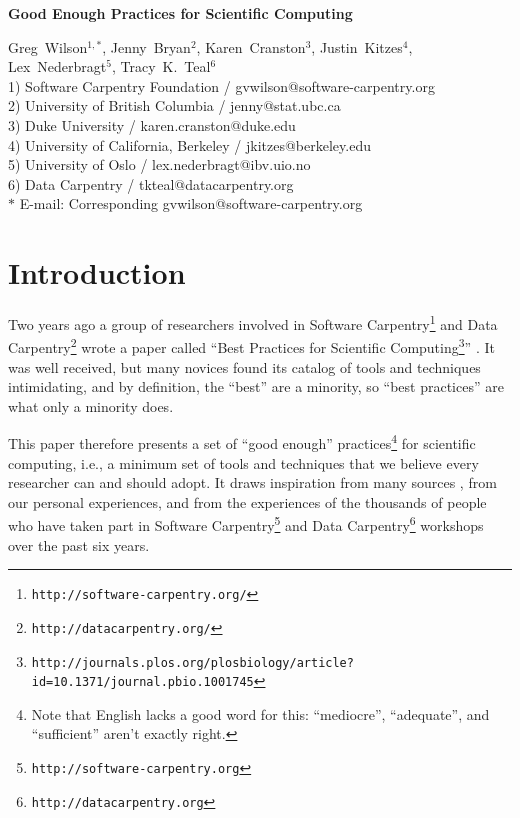 \documentclass[10pt]{article}
\date{}
\newcommand{\withurl}[2]{{#1}\footnote{\texttt{#2}}}
\begin{document}
\begin{flushleft}
{\Large
\textbf{Good Enough Practices for Scientific Computing}
}

{Greg~Wilson}$^{1,\ast}$,
{Jenny~Bryan}$^{2}$,
{Karen~Cranston}$^{3}$,
{Justin~Kitzes}$^{4}$,
{Lex~Nederbragt}$^{5}$,
{Tracy~K.~Teal}$^{6}$
\\
1) Software Carpentry Foundation / gvwilson@software-carpentry.org
\\
2) University of British Columbia / jenny@stat.ubc.ca
\\
3) Duke University / karen.cranston@duke.edu
\\
4) University of California, Berkeley / jkitzes@berkeley.edu
\\
5) University of Oslo / lex.nederbragt@ibv.uio.no
\\
6) Data Carpentry / tkteal@datacarpentry.org
\\
$\ast$ E-mail: Corresponding gvwilson@software-carpentry.org
\end{flushleft}

\section{Introduction}\label{sec:introduction}

Two years ago a group of researchers involved in \withurl{Software
  Carpentry}{http://software-carpentry.org/} and \withurl{Data
  Carpentry}{http://datacarpentry.org/} wrote a paper called
``\withurl{Best Practices for Scientific
  Computing}{http://journals.plos.org/plosbiology/article?id=10.1371/journal.pbio.1001745}''
\cite{wilson2014}. It was well received,
but many novices found its catalog of tools and
techniques intimidating, and by definition, the ``best'' are a
minority, so ``best practices'' are what only a minority does.

This paper therefore presents a set of ``good enough''
practices\footnote{Note that English lacks a good word for this:
  ``mediocre'', ``adequate'', and ``sufficient'' aren't exactly
  right.} for scientific computing, i.e., a minimum set of tools and techniques that we believe every
researcher can and should adopt. It draws inspiration from many
sources \cite{gentzkow2014,noble2009,brown2015,wickham2014,kitzes2016,sandve2013,hart2015},
from our personal experiences,
and from the experiences of the thousands of people who have taken part
in \withurl{Software Carpentry}{http://software-carpentry.org}
and \withurl{Data Carpentry}{http://datacarpentry.org} workshops over the past six years.
\end{document}
